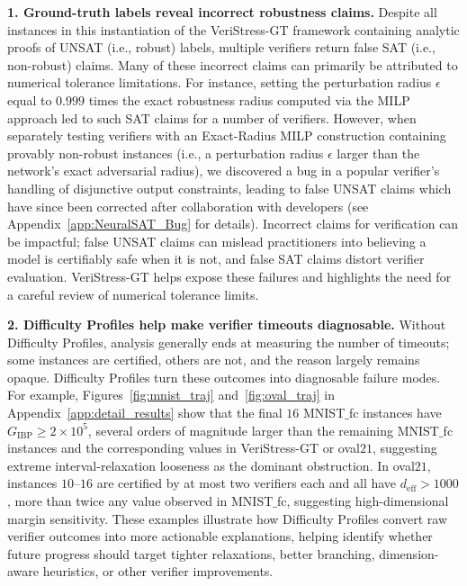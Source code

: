\documentclass{article}
\theoremstyle{definition}
\begin{document}
\textbf{1. Ground-truth labels reveal incorrect robustness claims.} 
Despite all instances in this instantiation of the VeriStress-GT framework containing analytic proofs of UNSAT (i.e., robust) labels, multiple verifiers return false SAT (i.e., non-robust) claims. Many of these incorrect claims can primarily be attributed to numerical tolerance limitations. For instance, setting the perturbation radius $\epsilon$ equal to $0.999$ times the exact robustness radius computed via the MILP approach led to such SAT claims for a number of verifiers. However, when separately testing verifiers with an Exact-Radius MILP construction containing provably non-robust instances (i.e., a perturbation radius $\epsilon$ larger than the network's exact adversarial radius), we discovered a bug in a popular verifier's handling of disjunctive output constraints, leading to false UNSAT claims which have since been corrected after collaboration with developers (see Appendix~\ref{app:NeuralSAT_Bug} for details). Incorrect claims for  verification can be impactful; false UNSAT claims can mislead practitioners into believing a model is certifiably safe when it is not, and false SAT claims distort verifier evaluation. VeriStress-GT helps expose these failures and highlights the need for a careful review of numerical tolerance limits.


\textbf{2. Difficulty Profiles help make verifier timeouts diagnosable.} Without Difficulty Profiles, analysis generally ends at measuring the number of timeouts; some instances are certified, others are not, and the reason largely remains opaque. Difficulty Profiles turn these outcomes into diagnosable failure modes. For example, Figures~\ref{fig:mnist_traj} and~\ref{fig:oval_traj} in Appendix~\ref{app:detail_results} show that the final $16$ MNIST$\_$fc instances have $G_{\mathrm{IBP}}\geq 2\times 10^5$, several orders of magnitude larger than the remaining MNIST$\_$fc instances and the corresponding values in VeriStress-GT or oval$21$, suggesting extreme interval-relaxation looseness as the dominant obstruction. In oval$21$, instances $10$--$16$ are certified by at most two verifiers each and all have $d_{\mathrm{eff}}>1000$, more than twice any value observed in MNIST$\_$fc, suggesting high-dimensional margin sensitivity. These examples illustrate how Difficulty Profiles convert raw verifier outcomes into more actionable explanations, helping identify whether future progress should target tighter relaxations, better branching, dimension-aware heuristics, or other verifier improvements.
\end{document}
